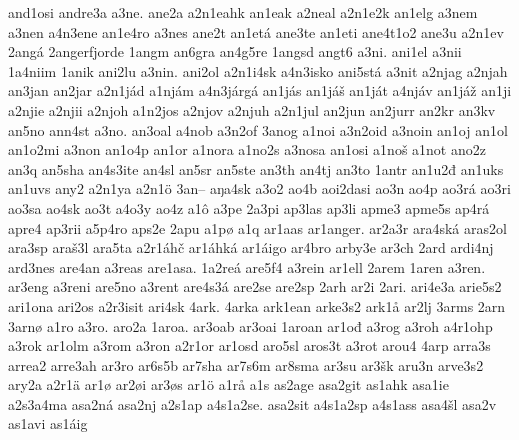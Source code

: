 {    and1osi
    andre3a
    a3ne.
    ane2a
    a2n1eahk
    an1eak
    a2neal
    a2n1e2k
    an1elg
    a3nem
    a3nen
    a4n3ene
    an1e4ro
    a3nes
    ane2t
    an1etá
    ane3te
    an1eti
    ane4t1o2
    ane3u
    a2n1ev
    2angá
    2angerfjorde
    1angm
    an6gra
    an4g5re
    1angsd
    angt6
    a3ni.
    ani1el
    a3nii
    1a4niim
    1anik
    ani2lu
    a3nin.
    ani2ol
    a2n1i4sk
    a4n3isko
    ani5stá
    a3nit
    a2njag
    a2njah
    an3jan
    an2jar
    a2n1jád
    a1njám
    a4n3járgá
    an1jás
    an1jáš
    an1ját
    a4njáv
    an1jáž
    an1ji
    a2njie
    a2njii
    a2njoh
    a1n2jos
    a2njov
    a2njuh
    a2n1jul
    an2jun
    an2jurr
    an2kr
    an3kv
    an5no
    ann4st
    a3no.
    an3oal
    a4nob
    a3n2of
    3anog
    a1noi
    a3n2oid
    a3noin
    an1oj
    an1ol
    an1o2mi
    a3non
    an1o4p
    an1or
    a1nora
    a1no2s
    a3nosa
    an1osi
    a1noš
    a1not
    ano2z
    an3q
    an5sha
    an4s3ite
    an4sl
    an5sr
    an5ste
    an3th
    an4tj
    an3to
    1antr
    an1u2đ
    an1uks
    an1uvs
    any2
    a2n1ya
    a2n1ö
    3an–
    aŋa4sk
    a3o2
    ao4b
    aoi2dasi
    ao3n
    ao4p
    ao3rá
    ao3ri
    ao3sa
    ao4sk
    ao3t
    a4o3y
    ao4z
    a1ô
    a3pe
    2a3pi
    ap3las
    ap3li
    apme3
    apme5s
    ap4rá
    apre4
    ap3rii
    a5p4ro
    aps2e
    2apu
    a1pø
    a1q
    ar1aas
    ar1anger.
    ar2a3r
    ara4ská
    aras2ol
    ara3sp
    araš3l
    ara5ta
    a2r1áhč
    ar1áhká
    ar1áigo
    ar4bro
    arby3e
    ar3ch
    2ard
    ardi4nj
    ard3nes
    are4an
    a3reas
    are1asa.
    1a2reá
    are5f4
    a3rein
    ar1ell
    2arem
    1aren
    a3ren.
    ar3eng
    a3reni
    are5no
    a3rent
    are4s3á
    are2se
    are2sp
    2arh
    ar2i
    2ari.
    ari4e3a
    arie5s2
    ari1ona
    ari2os
    a2r3isit
    ari4sk
    4ark.
    4arka
    ark1ean
    arke3s2
    ark1å
    ar2lj
    3arms
    2arn
    3arnø
    a1ro
    a3ro.
    aro2a
    1aroa.
    ar3oab
    ar3oai
    1aroan
    ar1ođ
    a3rog
    a3roh
    a4r1ohp
    a3rok
    ar1olm
    a3rom
    a3ron
    a2r1or
    ar1osd
    aro5sl
    aros3t
    a3rot
    arou4
    4arp
    arra3s
    arrea2
    arre3ah
    ar3ro
    ar6s5b
    ar7sha
    ar7s6m
    ar8sma
    ar3su
    ar3šk
    aru3n
    arve3s2
    ary2a
    a2r1ä
    ar1ø
    ar2øi
    ar3øs
    ar1ö
    a1rå
    a1s
    as2age
    asa2git
    as1ahk
    asa1ie
    a2s3a4ma
    asa2ná
    asa2nj
    a2s1ap
    a4s1a2se.
    asa2sit
    a4s1a2sp
    a4s1ass
    asa4šl
    asa2v
    as1avi
    as1áig
}
